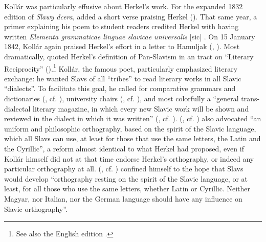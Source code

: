 Kollár was particularly effusive about Herkel’s work. For the expanded 1832 edition of \textit{Slawy dcera}, \citeauthor{kollar_slawy_1832} added a short verse praising Herkel (\citeyear[verse 462]{kollar_slawy_1832}). That same year, a primer explaining his poem to student readers credited Herkel with having written \textit{Elementa grammaticae linguae slavicae universalis} [sic] \citep[349]{kollar_wyklad_1832}. On 15 January 1842, Kollár again praised Herkel’s effort in a letter to Hamuljak (, \cite{anon_hamuljakova_1863}). Most dramatically, \citeauthor{kollar_uber_1837} quoted Herkel’s definition of Pan-Slavism in an \citeyear{kollar_uber_1837} tract on “Literary Reciprocity” (\citeyear[88--89]{kollar_uber_1837}).\footnote{See also the English edition \citet[115--116]{kollar_reciprocity_2009}.} Kollár, the famous poet, particularly emphasized literary exchange: he wanted Slavs of all “tribes” to read literary works in all Slavic “dialects”. To facilitate this goal, he called for comparative grammars and dictionaries (\citeyear[126]{kollar_uber_1837}, cf. \citeyear[133]{kollar_reciprocity_2009}), university chairs (\citeyear[122]{kollar_uber_1837}, cf. \citeyear[131]{kollar_reciprocity_2009}), and most colorfully a “general trans-dialectal literary magazine, in which every new Slavic work will be shown and reviewed in the dialect in which it was written” (\citeyear[123]{kollar_uber_1837}, cf. \citeyear[132]{kollar_reciprocity_2009}). \citeauthor{kollar_uber_1837} (\citeyear[127--128]{kollar_uber_1837}, cf. \citeyear[134]{kollar_reciprocity_2009}) also advocated “an uniform and philosophic orthography, based on the spirit of the Slavic language, which all Slavs can use, at least for those that use the same letters, the Latin and the Cyrillic”, a reform almost identical to what Herkel had proposed, even if Kollár himself did not at that time endorse Herkel’s orthography, or indeed any particular orthography at all. \citeauthor{kollar_uber_1837} (\citeyear[128]{kollar_uber_1837}, cf. \citeyear[134]{kollar_reciprocity_2009}) confined himself to the hope that Slavs would develop “orthography resting on the spirit of the Slavic language, or at least, for all those who use the same letters, whether Latin or Cyrillic. Neither Magyar, nor Italian, nor the German language should have any influence on Slavic orthography”.

